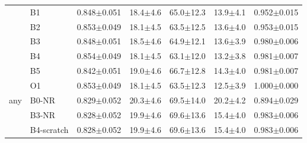 \begin{table}[!t]
\begin{tabular}{llccccc}
 & B1 & 0.848$\pm$0.051 & 18.4$\pm$4.6 & 65.0$\pm$12.3 & 13.9$\pm$4.1 & 0.952$\pm$0.015 \\
 & B2 & 0.853$\pm$0.049 & 18.1$\pm$4.5 & 63.5$\pm$12.5 & 13.6$\pm$4.0 & 0.953$\pm$0.015 \\
 & B3 & 0.848$\pm$0.051 & 18.5$\pm$4.6 & 64.9$\pm$12.1 & 13.6$\pm$3.9 & 0.980$\pm$0.006 \\
 & B4 & 0.854$\pm$0.049 & 18.1$\pm$4.5 & 63.1$\pm$12.0 & 13.2$\pm$3.8 & 0.981$\pm$0.007 \\
 & B5 & 0.842$\pm$0.051 & 19.0$\pm$4.6 & 66.7$\pm$12.8 & 14.3$\pm$4.0 & 0.981$\pm$0.007 \\
 & O1 & 0.853$\pm$0.049 & 18.1$\pm$4.5 & 63.5$\pm$12.3 & 12.5$\pm$3.9 & 1.000$\pm$0.000 \\
\midrule
any & B0-NR & 0.829$\pm$0.052 & 20.3$\pm$4.6 & 69.5$\pm$14.0 & 20.2$\pm$4.2 & 0.894$\pm$0.029 \\
 & B3-NR & 0.828$\pm$0.052 & 19.9$\pm$4.6 & 69.6$\pm$13.6 & 15.4$\pm$4.0 & 0.983$\pm$0.006 \\
 & B4-scratch & 0.828$\pm$0.052 & 19.9$\pm$4.6 & 69.6$\pm$13.6 & 15.4$\pm$4.0 & 0.983$\pm$0.006 \\
\bottomrule
\end{tabular}
\end{table}
